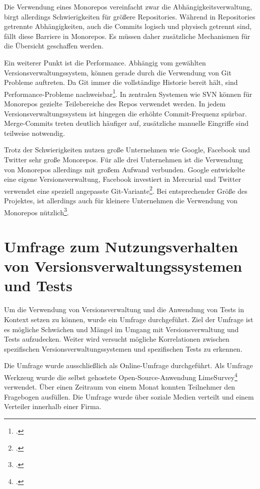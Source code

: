 Die Verwendung eines Monorepos vereinfacht zwar die Abhängigkeitsverwaltung, birgt allerdings Schwierigkeiten für größere Repositories. Während in Repositories getrennte Abhängigkeiten, auch die Commits logisch und physisch getrennt sind, fällt diese Barriere in Monorepos. Es müssen daher zusätzliche Mechanismen für die Übersicht geschaffen werden.

Ein weiterer Punkt ist die Performance. Abhängig vom gewählten Versionsverwaltungssystem, können gerade durch die Verwendung von Git Probleme auftreten. Da Git immer die vollständige Historie bereit hält, sind Performance-Probleme nachweisbar\footcite{atlassian-monorepo-git}. In zentralen Systemen wie SVN können für Monorepos gezielte Teilebereiche des Repos verwendet werden. 
In jedem Versionsverwaltungssystem ist hingegen die erhöhte Commit-Frequenz spürbar. Merge-Commits treten deutlich häufiger auf, zusätzliche manuelle Eingriffe sind teilweise notwendig.

Trotz der Schwierigkeiten nutzen große Unternehmen wie Google, Facebook und Twitter sehr große Monorepos. Für alle drei Unternehmen ist die Verwendung von Monorepos allerdings mit großem Aufwand verbunden. Google entwickelte eine eigene Versionsverwaltung, Facebook investiert in Mercurial und Twitter verwendet eine speziell angepasste Git-Variante\footcite{monorepos-wild}.
Bei entsprechender Größe des Projektes, ist allerdings auch für kleinere Unternehmen die Verwendung von Monorepos nützlich\footcite{hackernoon-positive-monorepo}.

\section{Umfrage zum Nutzungsverhalten von Versionsverwaltungssystemen und Tests}
\label{survey-vcs-test}

Um die Verwendung von Versionsverwaltung und die Anwendung von Tests in Kontext setzen zu können, wurde ein Umfrage durchgeführt.
Ziel der Umfrage ist es mögliche Schwächen und Mängel im Umgang mit Versionsverwaltung und Tests aufzudecken. Weiter wird versucht mögliche Korrelationen zwischen spezifischen Versionsverwaltungssystemen und spezifischen Tests zu erkennen.

Die Umfrage wurde ausschließlich als Online-Umfrage durchgeführt. Als Umfrage Werkzeug wurde die selbst gehostete Open-Source-Anwendung \glqq LimeSurvey\grqq{}\footcite[][]{limesurvey} verwendet. Über einen Zeitraum von einem Monat konnten Teilnehmer den Fragebogen ausfüllen. Die Umfrage wurde über soziale Medien verteilt und einem Verteiler innerhalb einer Firma.

